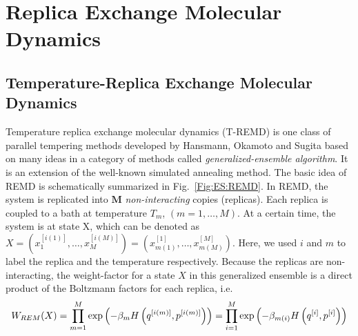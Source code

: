 \section{Replica Exchange Molecular Dynamics\label{Sec:ES:REMD}}
\subsection{Temperature-Replica Exchange Molecular Dynamics\label{Sec:ES:REMD:TREMD}}
Temperature replica exchange molecular dynamics (T-REMD) is one class of parallel tempering methods developed by Hansmann, Okamoto and Sugita\cite{HansmannJCC1993,HansmannCPL1997,SugitaCPL1999} based on many ideas in a category of methods called \textit{generalized-ensemble algorithm}. It is an extension of the well-known simulated annealing method. The basic idea of REMD is schematically summarized in Fig.~\ref{Fig:ES:REMD}. In REMD, the system is replicated into $\mathbf{M}$ \textit{non-interacting} copies (replicas). Each replica is coupled to a bath at temperature $T_m$, $(m=1,\dots,M)$. At a certain time, the system is at state X, which can be denoted as $X=\left(x_1^{[i(1)]},\dots,x_M^{[i(M)]}\right)=\left(x_{m(1)}^{[1]},\dots,x_{m(M)}^{[M]}\right)$. Here, we used $i$ and $m$ to label the replica and the temperature respectively. Because the replicas are non-interacting, the weight-factor for a state $X$ in this generalized ensemble is a direct product of the Boltzmann factors for each replica, i.e.
\begin{equation}
	W_{REM}(X)=\prod\limits_{m=1}^M\exp{\left(-\beta_m H\left(q^{[i(m)]},p^{[i(m)]}\right)\right)}=\prod\limits_{i=1}^M \exp{\left(-\beta_{m(i)}H\left(q^{[i]},p^{[i]}\right)\right)}\textsl{}
\end{equation}

